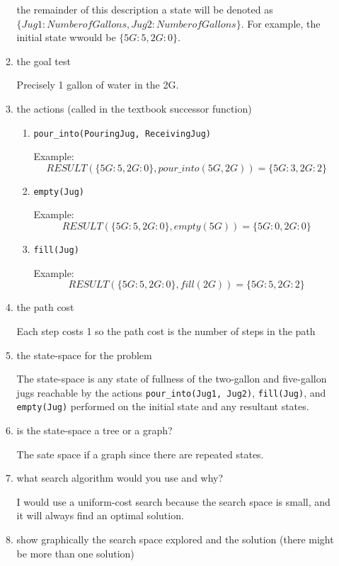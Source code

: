 \documentclass[11pt]{article}  %
\begin{document}
\begin{enumerate}
\begin{enumerate}
      the remainder of this description a state will be denoted as \(\lbrace
      Jug1 : NumberofGallons, Jug2 : NumberofGallons\rbrace\).  For example, the
      initial state wwould be \(\lbrace 5G:5, 2G:0\rbrace\). 
      \item the goal test
      \par
      Precisely 1 gallon of water in the 2G.
      \item the actions (called in the textbook successor function)
      \begin{enumerate}
        \item \texttt{pour\_into(PouringJug, ReceivingJug)}
        \par 
        Example: \[RESULT(\lbrace 5G : 5, 2G:0\rbrace, pour\_into(5G,
        2G)) = \lbrace 5G : 3, 2G:2\rbrace\]
        \item \texttt{empty(Jug)}
        \par
        Example: \[RESULT(\lbrace 5G : 5, 2G : 0\rbrace, empty(5G)) = \lbrace
        5G:0, 2G : 0 \rbrace\]
        \item \texttt{fill(Jug)}
        \par
        Example: \[RESULT(\lbrace 5G : 5, 2G : 0\rbrace, fill(2G)) = \lbrace
        5G:5, 2G : 2 \rbrace\]
      \end{enumerate}
      \item the path cost
      \par
      Each step costs 1 so the path cost is the number of steps in the path
      \item the state-space for the problem
      \par
      The state-space is any state of fullness of the two-gallon and
      five-gallon jugs reachable by the actions \texttt{pour\_into(Jug1, Jug2)},
      \texttt{fill(Jug)}, and \texttt{empty(Jug)} performed on the initial state
      and any resultant states.
      \item is the state-space a tree or a graph?
      \par
      The sate space if a graph since there are repeated states.
      \item what search algorithm would you use and why?
      \par 
      I would use a uniform-cost search because the search space is small, and
      it will always find an optimal solution.
      \item show graphically the search space explored and the solution (there
      might be more than one solution)
      \par

\end{enumerate}
\end{enumerate}
\end{document}
